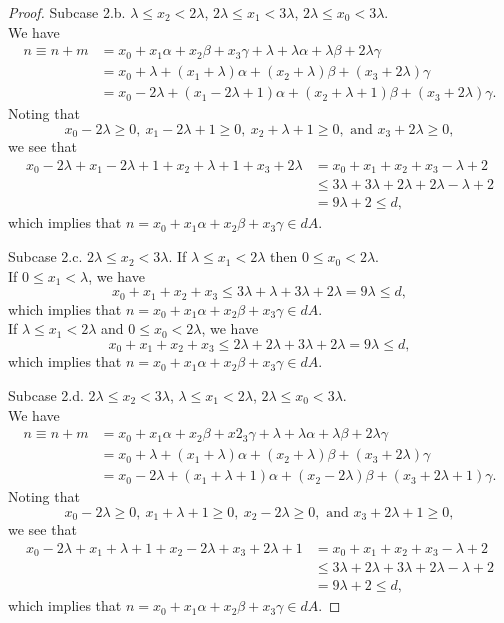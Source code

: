 \begin{proof}
Subcase 2.b. $\lambda \leq x_2 < 2 \lambda$, $2 \lambda \leq x_1 < 3\lambda$,  $2\lambda \leq x_0 < 3\lambda$. \\
We have
\begin{align*}
n \equiv n + m &= x_0 + x_1\alpha + x_2\beta + x_3\gamma + \lambda + \lambda \alpha + \lambda \beta + 2 \lambda \gamma\\
&=  x_0 + \lambda + (x_1 + \lambda) \alpha + (x_2 + \lambda) \beta + (x_3 + 2 \lambda) \gamma\\ 
&=  x_0 -  2\lambda + (x_1 - 2 \lambda + 1) \alpha + (x_2 + \lambda + 1) \beta + (x_3 + 2 \lambda)
 \gamma.
\end{align*}
Noting that
\[  x_0 -  2\lambda \geq 0, \  x_1 - 2 \lambda + 1 \geq 0,  \ x_2 + \lambda + 1 \geq 0, \text{ and } x_3 + 2 \lambda \geq 0, \]
we see that 
\begin{align*}
x_0 -  2\lambda + x_1 - 2 \lambda + 1 + x_2 + \lambda + 1 + x_3 + 2 \lambda &= x_0  + x_1 +  x_2 + x_3 -  \lambda + 2 \\
&\leq 3 \lambda + 3 \lambda + 2 \lambda + 2\lambda - \lambda + 2\\
&= 9 \lambda + 2 \leq d,
\end{align*}
which implies that $n = x_0 + x_1\alpha + x_2\beta + x_3\gamma \in dA$. 

Subcase 2.c. $2 \lambda \leq x_2 < 3 \lambda.$ If $ \lambda \leq x_1 < 2 \lambda$ then $0 \leq x_0 < 2\lambda$. \\
If $0 \leq x_1 < \lambda$, we have 
\[ x_0 + x_1 + x_2 + x_3 \leq 3\lambda + \lambda + 3 \lambda + 2\lambda = 9\lambda \leq d, \]
which implies that $n = x_0 + x_1\alpha + x_2\beta + x_3\gamma \in dA$. \\
If $ \lambda \leq x_1 < 2 \lambda$ and  $0 \leq x_0 < 2\lambda$, we have 
\[ x_0 + x_1 + x_2 + x_3 \leq 2\lambda + 2\lambda + 3\lambda + 2 \lambda = 9\lambda \leq d, \]
which implies that $n = x_0 + x_1\alpha + x_2\beta + x_3\gamma \in dA$. 

Subcase 2.d. $2\lambda \leq x_2 < 3 \lambda$, $ \lambda \leq x_1 < 2\lambda$,  $2\lambda \leq x_0 < 3\lambda$. \\
We have
\begin{align*}
n \equiv n + m &= x_0 + x_1\alpha + x_2\beta + x2_3\gamma + \lambda + \lambda \alpha + \lambda \beta + 2 \lambda \gamma\\
&=  x_0 + \lambda + (x_1 + \lambda) \alpha + (x_2 + \lambda) \beta + (x_3 + 2 \lambda) \gamma\\ 
&=  x_0 -  2\lambda + (x_1 + \lambda + 1) \alpha + (x_2 - 2 \lambda) \beta + (x_3 + 2 \lambda + 1)
 \gamma.
\end{align*}
Noting that
\[  x_0 -  2\lambda \geq 0,  \ x_1 + \lambda + 1 \geq 0, \  x_2 - 2 \lambda \geq 0, \text{ and } x_3 + 2 \lambda + 1 \geq 0, \]
we see that 
\begin{align*}
x_0 -  2\lambda + x_1 + \lambda + 1 + x_2  - 2 \lambda + x_3 + 2 \lambda + 1 &= x_0  + x_1 +  x_2 + x_3 -  \lambda + 2 \\
&\leq 3 \lambda + 2 \lambda + 3 \lambda + 2\lambda - \lambda + 2\\
&= 9 \lambda + 2 \leq d,
\end{align*}
which implies that $n = x_0 + x_1\alpha + x_2\beta + x_3\gamma \in dA$. 


\end{proof}
